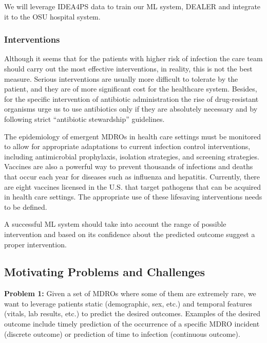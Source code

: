 We will leverage IDEA4PS data to train our ML system, DEALER and integrate it to the OSU hospital system.


\subsubsection{Interventions}
Although it seems that for the patients with higher risk of infection the care team should carry out the most effective interventions, in reality, this is not the best measure. Serious interventions are usually more difficult to tolerate by the patient, and they are of more significant cost for the healthcare system. Besides, for the specific intervention of antibiotic administration the rise of drug-resistant organisms urge us to use antibiotics only if they are absolutely necessary and by following strict ``antibiotic stewardship'' guidelines. 

The epidemiology of emergent MDROs in health care settings must be monitored to allow for appropriate adaptations to current infection control interventions, including antimicrobial prophylaxis, isolation strategies, and screening strategies. Vaccines are also a powerful way to prevent thousands of infections and deaths that occur each year for diseases such as influenza and hepatitis. Currently, there are eight vaccines licensed in the U.S. that target pathogens that can be acquired in health care settings. The appropriate use of these lifesaving interventions needs to be defined. 

A successful ML system should take into account the range of possible intervention and based on its confidence about the predicted outcome suggest a proper intervention. 


\subsection{Motivating Problems and Challenges}
{\noindent \bf Problem 1:} Given a set of MDROs where some of them are extremely rare, we want to leverage patients static (demographic, sex, etc.) and temporal features (vitals, lab results, etc.) to predict the desired outcomes. Examples of the desired outcome include timely prediction of the occurrence of a specific MDRO incident (discrete outcome) or prediction of time to infection (continuous outcome). 

